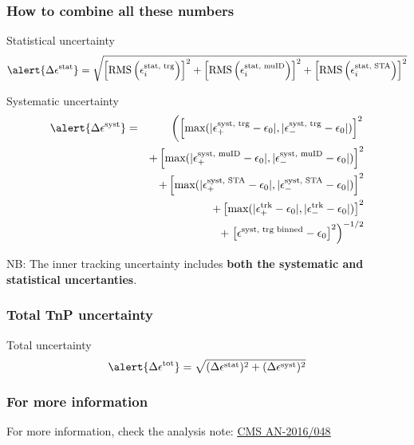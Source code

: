 \documentclass[9pt]{beamer}
\begin{document}
 \begin{frame}[plain]
  \frametitle{How to combine all these numbers}
  
  
  \begin{block}{Statistical uncertainty}
   \begin{equation*}
    \alert{\Delta\epsilon^\text{stat}}  =  \sqrt{ \left[\text{RMS} \left( \epsilon^\text{stat, trg}_i \right)\right]^2
     + \left[ \text{RMS} \left( \epsilon^\text{stat, muID}_i \right) \right]^2
     + \left[ \text{RMS} \left( \epsilon^\text{stat, STA}_i \right) \right]^2 }
   \end{equation*}

  \end{block}
  
  \begin{block}{Systematic uncertainty}
   \begin{eqnarray}
    \alert{\Delta\epsilon^\text{syst}}  & = &  \left(\left[\text{max} (|\epsilon^\text{syst, trg}_{+} - \epsilon_0|, |\epsilon^\text{syst, trg}_{-} - \epsilon_0|)\right]^2\right.\nonumber\\
    &&+ \left[\text{max} (|\epsilon^\text{syst, muID}_{+} - \epsilon_0|, |\epsilon^\text{syst, muID}_{-} - \epsilon_0|)\right]^2\nonumber\\
    &&+ \left[\text{max} (|\epsilon^\text{syst, STA}_{+} - \epsilon_0|, |\epsilon^\text{syst, STA}_{-} - \epsilon_0|)\right]^2\nonumber\\
    &&+ \left[\text{max} (|\epsilon^\text{trk}_{+} - \epsilon_0|, |\epsilon^\text{trk}_{-} - \epsilon_0|)\right]^2\nonumber\\
    &&+ \left.\left[\epsilon^\text{syst, trg binned} - \epsilon_0\right]^2\right)^{-1/2}\nonumber
   \end{eqnarray}
   
   \footnotesize \alert{NB}: The inner tracking uncertainty includes \textbf{both the systematic and statistical uncertanties}.

  \end{block}

 \end{frame}
 
 \begin{frame}[plain]
  \frametitle{Total TnP uncertainty}
  
  \begin{block}{Total uncertainty}
   \begin{equation*}
    \alert{\Delta\epsilon^\text{tot}}  =  \sqrt{ (\Delta\epsilon^\text{stat})^2 + (\Delta\epsilon^\text{syst})^2 }
   \end{equation*}

  \end{block}
  
 \end{frame}
 
 \begin{frame}[plain]
  \frametitle{For more information}
  
  For more information, check the analysis note: \underline{\href{http://cms.cern.ch/iCMS/jsp/db_notes/noteInfo.jsp?cmsnoteid=CMS\%20AN-2016/048}{CMS AN-2016/048}}
 \end{frame}
\end{document}

